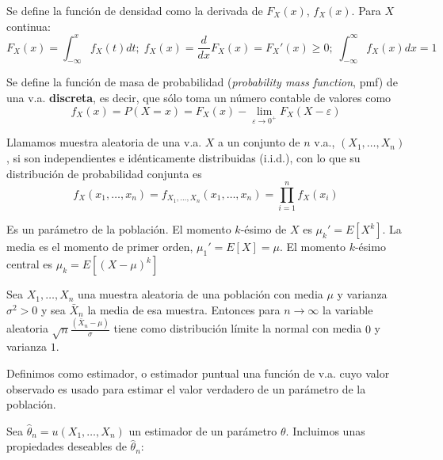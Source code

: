 \begin{definicion}
	Se define la función de densidad como la derivada de $F_X(x)$, $f_X(x)$. Para $X$ continua:
	\[ F_X(x) = \int_{-\infty}^x f_X(t) dt; \;
		f_X(x) = \frac{d}{dx}F_X(x) = F_X'(x) \geq 0; \;
		\int_{-\infty}^{\infty} f_X(x) dx = 1 \]
\end{definicion}
	
\begin{definicion}
	Se define la función de masa de probabilidad  (\textit{probability mass function}, pmf) de una v.a. \textbf{discreta}, es decir, que sólo toma un número contable de valores como
	\[ 
	f_X(x) = P(X=x) = 
		F_X(x) - 
		\lim_{\varepsilon \rightarrow 0^+} F_X(X-\varepsilon)
	\]
\end{definicion}

\begin{definicion}
	Llamamos muestra aleatoria de una v.a. $X$ a un conjunto de $n$ v.a., $(X_1, \dots, X_n)$, si son independientes e idénticamente distribuidas (i.i.d.), con lo que su distribución de probabilidad conjunta es
	\[ 
		f_{X}(x_1, \dots, x_n) =
		f_{X_1, \dots, X_n}(x_1, \dots, x_n) =
		\prod\limits_{i=1}^n f_X(x_i)
	\]
\end{definicion}
	
\begin{definicion}[Momento]
	Es un parámetro de la población. El momento $k$-ésimo de $X$ es $\mu_k' = E[X^k]$. La media es el momento de primer orden, $\mu_1' = E[X] = \mu$. El momento $k$-ésimo central es $\mu_k = E[(X - \mu)^k]$
\end{definicion}

\begin{teorema}
	Sea $X_1, \dots, X_n$ una muestra aleatoria de una población con media $\mu$ y varianza $\sigma^2 > 0$ y sea $\bar{X}_n$ la media de esa muestra. Entonces para $n \rightarrow \infty$ la variable aleatoria $\sqrt{n} \frac{(\bar{X}_n - \mu)}{\sigma}$ tiene como distribución límite la normal con media $0$ y varianza $1$.
\end{teorema}

\begin{definicion}[Estimador]
	Definimos como estimador, o estimador puntual una función de v.a. cuyo valor observado es usado para estimar el valor verdadero de un parámetro de la población. 
\end{definicion}

	Sea $\hat{\theta}_n = u(X_1, \dots, X_n)$ un estimador de un parámetro $\theta$. Incluimos unas propiedades deseables de $\hat{\theta}_n$:
	
